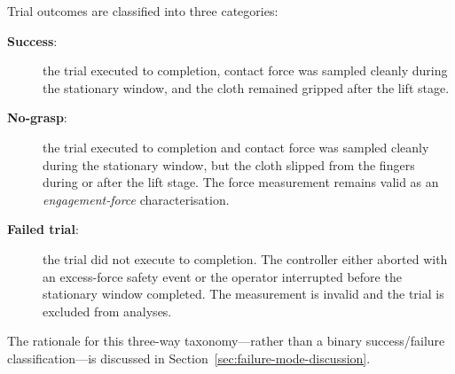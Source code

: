 Trial outcomes are classified into three categories:
\begin{description}
  \item[\textbf{Success}:] the trial executed to completion, contact
        force was sampled cleanly during the stationary window, and the
        cloth remained gripped after the lift stage.
  \item[\textbf{No-grasp}:] the trial executed to completion and
        contact force was sampled cleanly during the stationary window,
        but the cloth slipped from the fingers during or after the lift
        stage. The force measurement remains valid as an
        \emph{engagement-force} characterisation.
  \item[\textbf{Failed trial}:] the trial did not execute to completion.
        The controller either aborted with an excess-force safety event
        or the operator interrupted before the stationary window
        completed. The measurement is invalid and the trial is excluded
        from analyses.
\end{description}

The rationale for this three-way taxonomy---rather than a binary
success/failure classification---is discussed in
Section~\ref{sec:failure-mode-discussion}.
